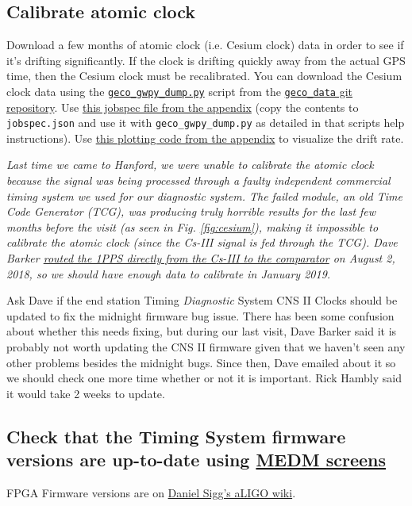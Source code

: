 \documentclass{article}
\newcommand*{\TODO}{\textcolor{todo}}
\begin{document}
\TODO{
\subsection{Calibrate atomic clock}
}
Download a few months of atomic clock (i.e. Cesium clock) data in order to see if it's drifting significantly. If the clock is drifting quickly away from the actual GPS time, then the Cesium clock must be recalibrated. You can download the Cesium clock data using the \href{https://github.com/stefco/geco_data/blob/master/geco_gwpy_dump.py}{\texttt{geco\_gwpy\_dump.py}} script from the \href{https://github.com/stefco/geco_data}{\texttt{geco\_data} git repository}. Use
\hyperref[sec:jobspec]{this jobspec file from the appendix} (copy the contents to \texttt{jobspec.json} and use it with \texttt{geco\_gwpy\_dump.py} as detailed in that scripts help instructions).
Use \hyperref[sec:plottingcode]{this plotting code from the appendix} to visualize the drift rate.

\textit{Last time we came to Hanford, we were unable to calibrate the atomic clock because the signal was being processed through a faulty independent commercial timing system we used for our diagnostic system. The failed module, an old \textit{Time Code Generator} (TCG), was producing truly horrible results for the last few months before the visit (as seen in Fig. \ref{fig:cesium}), making it impossible to calibrate the atomic clock (since the Cs-III signal is fed through the TCG). Dave Barker \href{https://alog.ligo-wa.caltech.edu/aLOG/index.php?callRep=43200}{routed the 1PPS directly from the Cs-III to the comparator} on August 2, 2018, so we should have enough data to calibrate in January 2019.}

Ask Dave if the end station Timing \textit{Diagnostic} System CNS II Clocks should be updated to fix the midnight firmware bug issue. There has been some confusion about whether this needs fixing, but during our last visit, Dave Barker said it is probably not worth updating the CNS II firmware given that we haven't seen any other problems besides the midnight bugs. Since then, Dave emailed about it so we should check one more time whether or not it is important. Rick Hambly said it would take 2 weeks to update. 

\TODO{
\subsection{Check that the Timing System firmware versions are up-to-date using 
\href{https://wiki.ligo.org/RemoteAccess/RemoteEPICS}{MEDM screens}}
}
FPGA Firmware versions are on \href{https://awiki.ligo-wa.caltech.edu/wiki/TimingFpgaCode}{Daniel Sigg's aLIGO wiki}.
\end{document}
